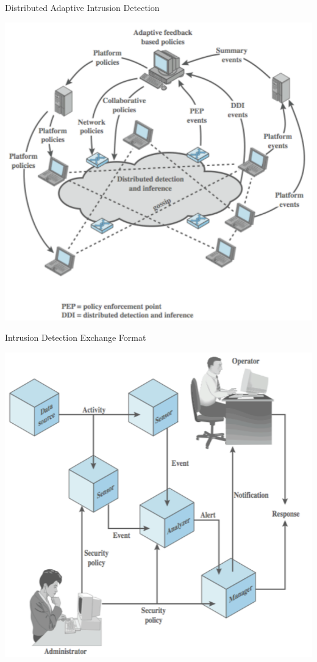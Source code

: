 \documentclass{beamer}
\begin{document}
\begin{frame}{Distributed Adaptive Intrusion Detection}
   \begin{center}
    \includegraphics[width=0.6\linewidth]{daids}
  \end{center}
\end{frame}

\begin{frame}{Intrusion Detection Exchange Format}
   \begin{center}
    \includegraphics[width=0.6\linewidth]{ids-format}
  \end{center}
\end{frame}
\end{document}
